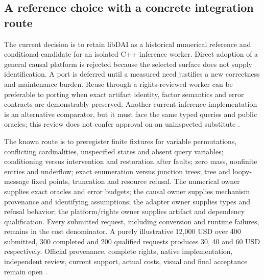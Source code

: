 \subsection{A reference choice with a concrete integration route}
The current decision is to retain libDAI as a historical numerical reference
and conditional candidate for an isolated C++ inference worker. Direct
adoption of a general causal platform is rejected because the selected
surface does not supply identification. A port is deferred until a measured
need justifies a new correctness and maintenance burden. Reuse through a
rights-reviewed worker can be preferable to porting when exact artifact
identity, factor semantics and error contracts are demonstrably preserved.
Another current inference implementation is an alternative comparator,
but it must face the same typed queries and public oracles; this review does
not confer approval on an uninspected substitute \cite{exec24_libdai_choice}.

The known route is to preregister finite fixtures for variable permutations,
conflicting cardinalities, unspecified states and absent query variables;
conditioning versus intervention and restoration after faults; zero mass,
nonfinite entries and underflow; exact enumeration versus junction trees;
tree and loopy-message fixed points, truncation and resource refusal.
The numerical owner supplies exact oracles and error budgets; the causal
owner supplies mechanism provenance and identifying assumptions; the
adapter owner supplies types and refusal behavior; the platform/rights owner
supplies artifact and dependency qualification. Every submitted request,
including conversion and runtime failures, remains in the cost denominator.
A purely illustrative 12,000 USD over 400 submitted, 300 completed and
200 qualified requests produces 30, 40 and 60 USD respectively.
Official provenance, complete rights, native implementation, independent
review, current support, actual costs, visual and final acceptance remain
open \cite{exec24_libdai_choice}.
